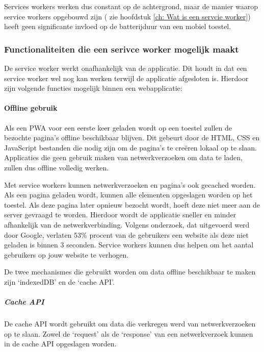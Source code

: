 		
		Services workers werken dus constant op de achtergrond, maar de manier waarop service workers opgebouwd zijn (
	zie hoofdstuk \ref{ch: Wat is een servcie worker}) heeft geen significante invloed op de batterijduur van een mobiel toestel.
		\autocite{Malavolta2016}
	
	
	\subsubsection{Functionaliteiten die een serivce worker mogelijk maakt}
	\label{ch: Functionaliteiten die een serivce worker mogelijk maakt}
	
		De service worker werkt onafhankelijk van de applicatie. Dit houdt in dat een service worker wel nog kan werken terwijl de applicatie afgesloten is. Hierdoor zijn volgende functies mogelijk binnen een webapplicatie:
	
		
		
		\paragraph{Offline gebruik}
		
			Als een PWA voor een eerste keer geladen wordt op een toestel zullen de bezochte pagina's offline beschikbaar blijven. Dit gebeurt door de  HTML, CSS en JavaScript bestanden die nodig zijn om de pagina's te creëren lokaal op te slaan. Applicaties die geen gebruik maken van netwerkverzoeken om data te laden, zullen dus offline volledig werken.
			
			Met service workers kunnen netwerkverzoeken en pagina’s ook gecached worden. Als een pagina geladen wordt, kunnen alle elementen opgeslagen worden op het toestel. Als deze pagina later opnieuw bezocht wordt, hoeft deze niet meer aan de server gevraagd te worden. Hierdoor wordt de applicatie sneller en minder afhankelijk van de netwerkverbinding.
			Volgens onderzoek, dat uitgevoerd werd door Google, verlaten 53\% procent van de gebruikers een website als deze niet geladen is binnen 3 seconden. Service workers kunnen dus helpen om het aantal gebruikers op jouw website te verhogen.
			\autocite{Google2017}
			
			De twee mechanismes die gebruikt worden om data offline beschikbaar te maken zijn ‘indexedDB’ en de ‘cache API’.
			\autocite{Osmani2019}
			\autocite{Mozilla2020a}
			
			
			

			\subparagraph{Cache API}

				De cache API wordt gebruikt om data die verkregen werd van netwerkverzoeken op te slaan. Zowel de ‘request’ als de ‘response’ van een netwerkverzoek kunnen in de cache API opgeslagen worden.
				\autocite{Scales2019}

